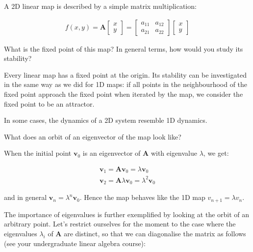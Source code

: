 \pagebreak


A 2D linear map is described by a simple matrix multiplication:

\begin{gather}
f(x,y) = {\mathbf A} 
\begin{bmatrix}
x \\
y
\end{bmatrix}
=
\begin{bmatrix}
a_{11} & a_{12} \\
a_{21} & a_{22}
\end{bmatrix}
\begin{bmatrix}
x \\
y
\end{bmatrix}
\end{gather} 

\begin{cue}
What is the fixed point of this map? In general terms, how would you study its stability? 
\end{cue}

Every linear map has a fixed point at the origin. Its stability can be investigated in the same way as we did for 1D maps: if all points in the neighbourhood of the fixed point approach the fixed point when iterated by the map, we consider the fixed point to be an attractor.

In some cases, the dynamics of a 2D system resemble 1D dynamics.

\begin{cue}
What does an orbit of an eigenvector of the map look like?  
\end{cue}

When the initial point ${\mathbf v_0}$ is an eigenvector of ${\mathbf A}$ with eigenvalue $\lambda$, we get:

\begin{gather}
{\mathbf v_1} = {\mathbf A}{\mathbf v_0} = \lambda {\mathbf v_0} \\
{\mathbf v_2} = {\mathbf A}\lambda {\mathbf v_0} = \lambda^2 {\mathbf v_0} 
\end{gather} 

and in general ${\mathbf v_n} = \lambda^n {\mathbf v_0}$. Hence the map behaves like the 1D map $v_{n+1} = \lambda v_n$.

The importance of eigenvalues is further exemplified by looking at the orbit of an arbitrary point. Let's restrict ourselves for the moment to the case where the eigenvalues $\lambda_i$ of ${\mathbf A}$ are distinct, so that we can diagonalise the matrix as follows (see your undergraduate linear algebra course):


